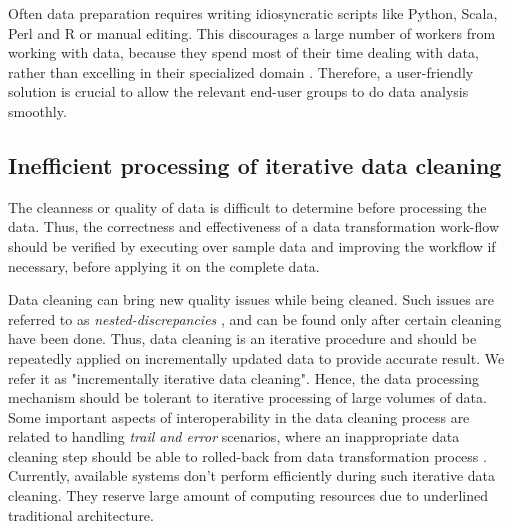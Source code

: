 Often data preparation requires writing idiosyncratic scripts like Python, Scala, Perl and R or manual editing. This discourages a large number of workers from working with data, because they spend most of their time dealing with data, rather than excelling in their specialized domain \cite{visualizationsandtransformationsinwrangling}. Therefore, a user-friendly solution is crucial to allow the relevant end-user groups to do data analysis smoothly.

\subsection{Inefficient processing of iterative data cleaning}
\noindent The cleanness or quality of data is difficult to determine before processing the data. Thus, the correctness and effectiveness of a data transformation work-flow should be verified by executing over sample data and improving the workflow if necessary, before applying it on the complete data. 

Data cleaning can bring new quality issues  while being cleaned. Such issues are referred to as \textit{nested-discrepancies } \cite{journals/corr/KrishnanW0FG16}, and can be found only after certain cleaning have been done. Thus, data cleaning is an iterative procedure \cite{Wisteria} and should be repeatedly applied on incrementally updated data to provide accurate result. We refer it as "incrementally iterative data cleaning". Hence, the data processing mechanism should be tolerant to iterative processing of large volumes of data. Some important aspects of interoperability in the data cleaning process are related to handling \textit{trail and error} scenarios, where an inappropriate data cleaning step should be able to rolled-back from data transformation process \cite{visualizationsandtransformationsinwrangling}. Currently, available systems don't perform efficiently during such iterative data cleaning. They reserve large amount of computing resources due to underlined traditional  architecture.


